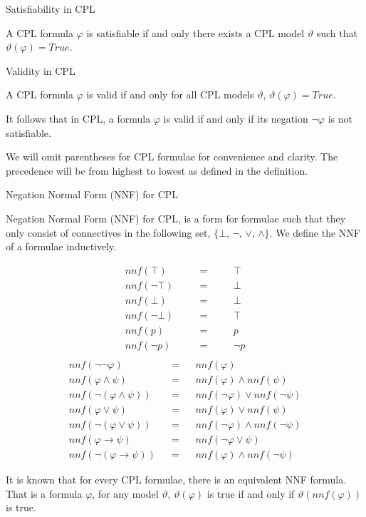 \documentclass{llncs}
\newcommand{\nnf}{{nnf}}
\begin{document}
\begin{definition}{Satisfiability in CPL}\label{Satisfiability in CPL}

A CPL formula $\varphi$ is satisfiable if and only there exists a CPL model
$\vartheta$ such that $\vartheta(\varphi) = True$.
\end{definition}
\begin{definition}{Validity in CPL}\label{Validity in CPL}

A CPL formula $\varphi$ is valid if and only for all CPL models
$\vartheta$, $\vartheta(\varphi) = True$.

It follows that in CPL, a formula $\varphi$ is valid if and only if its
negation $\neg \varphi$ is not satisfiable.
\end{definition}
%
We will omit parentheses for CPL formulae for convenience and clarity. The
precedence will be from highest to lowest as defined in the definition.
%
\begin{definition}{Negation Normal Form (NNF) for CPL}\label{NNF for CPL}

Negation Normal Form (NNF) for CPL, is a form for formulae such that they only
consist of connectives in the following set, $\{\bot, \, \neg, \, \vee,\,
\wedge\}$. We define the NNF of a formulae inductively.
%
\vspace{-15mm}
\begin{vwcol}[widths={0.4,0.6}, sep=0cm, justify=flush,rule=0pt,indent=1em]
$$
\begin{array}{rlcll}
\nnf(\top)&\quad&=&\quad&\top \\
\nnf(\neg\top)&&=&&\bot \\
\nnf(\bot)&\quad&=&\quad&\bot \\
\nnf(\neg\bot)&&=&&\top \\
\nnf(p)&&=&&p \\
\nnf(\neg p)&&=&&\neg p \\
\end{array}
$$
\break
$$
\begin{array}{rlcll}
\nnf(\neg\neg\varphi)&&=&&\nnf(\varphi) \\
\nnf(\varphi \wedge \psi)&&=&&\nnf(\varphi) \wedge \nnf(\psi) \\
\nnf(\neg(\varphi \wedge \psi))&&=&&\nnf(\neg\varphi) \vee \nnf(\neg\psi) \\
\nnf(\varphi \vee \psi)&&=&&\nnf(\varphi) \vee \nnf(\psi) \\
\nnf(\neg(\varphi \vee \psi))&&=&&\nnf(\neg\varphi) \wedge \nnf(\neg\psi) \\
\nnf(\varphi \rightarrow \psi)&&=&&\nnf(\neg\varphi \vee \psi) \\
\nnf(\neg(\varphi \rightarrow \psi))&&=&&\nnf(\varphi) \wedge \nnf(\neg\psi)
\end{array}
$$
\end{vwcol}
\vspace{4mm}
%
It is known that for every CPL formulae, there is an equivalent NNF formula.
That is a formula $\varphi$, for any model $\vartheta$, $\vartheta(\varphi)$ is
true if and only if $\vartheta(\nnf(\varphi))$ is true.
\end{definition}
\end{document}
